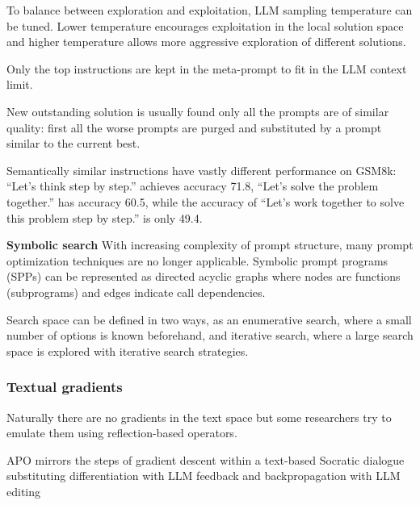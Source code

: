 To balance between exploration and exploitation, LLM sampling temperature can be tuned. Lower temperature encourages exploitation in the local solution space and higher temperature allows more aggressive exploration of different solutions. \cite{yang2024largelanguagemodelsoptimizers}

Only the top instructions are kept in the meta-prompt to fit in the LLM context limit. \cite{yang2024largelanguagemodelsoptimizers}

New outstanding solution is usually found only all the prompts are of similar quality: first all the worse prompts are purged and substituted by a prompt similar to the current best. \cite{yang2024largelanguagemodelsoptimizers}

Semantically similar instructions have vastly different performance on GSM8k: “Let’s think step by step.” achieves accuracy 71.8, “Let’s solve the problem together.” has accuracy 60.5, while the accuracy of “Let’s work together to solve this problem step by step.” is only 49.4. \cite{yang2024largelanguagemodelsoptimizers}





\textbf{Symbolic search}
With increasing complexity of prompt structure, many prompt optimization techniques are no longer applicable. \cite{schnabel2024symbolicpromptprogramsearch}
Symbolic prompt programs (SPPs) can be represented as directed acyclic graphs where nodes are functions (subprograms) and edges indicate call dependencies. \cite{schnabel2024symbolicpromptprogramsearch}

Search space can be defined in two ways, as an enumerative search, where a small number of options is known beforehand, and iterative search, where a large search space is explored with iterative search strategies. \cite{schnabel2024symbolicpromptprogramsearch}



\subsubsection{Textual gradients}
Naturally there are no gradients in the text space but some researchers try to emulate them using reflection-based operators.

APO mirrors the steps of gradient descent within a text-based Socratic dialogue substituting differentiation with LLM feedback and backpropagation with LLM editing \cite{pryzant2023automaticpromptoptimizationgradient}

